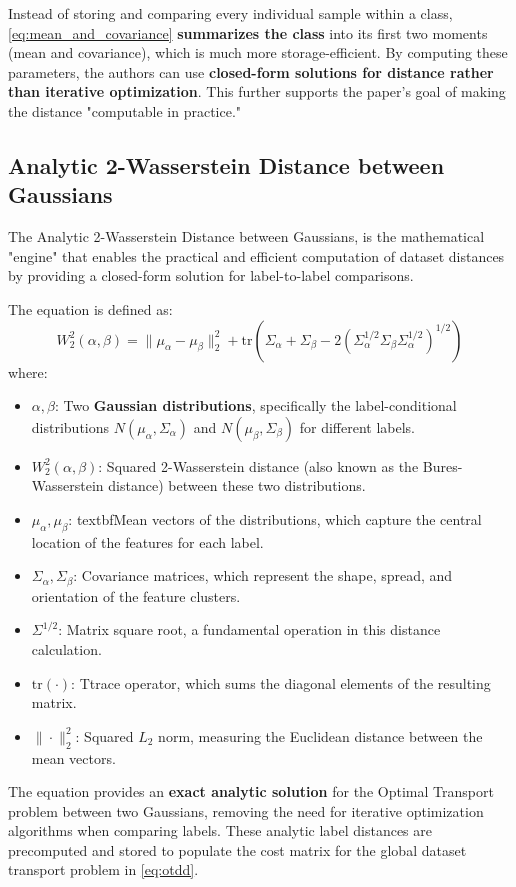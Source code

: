 \documentclass[11pt, a4paper]{article}
\theoremstyle{plain} %
\theoremstyle{definition} %
\begin{document}
			Instead of storing and comparing every individual sample within a class, \cref{eq:mean_and_covariance} \textbf{summarizes the class} into its first two moments (mean and covariance), which is much more storage-efficient. By computing these parameters, the authors can use \textbf{closed-form solutions for distance rather than iterative optimization}. This further supports the paper's goal of making the distance "computable in practice."


		\subsection{Analytic 2-Wasserstein Distance between Gaussians}
		\label{sec:wasserstein_between_gaussians}
			The Analytic 2-Wasserstein Distance between Gaussians, is the mathematical "engine" that enables the practical and efficient computation of dataset distances by providing a closed-form solution for label-to-label comparisons.

			The equation is defined as:
			\begin{equation}
				\label{eq:2_wasserstein}
				W_2^2(\alpha, \beta) = \|\mu_\alpha - \mu_\beta\|_2^2 + \text{tr}\left(\Sigma_\alpha + \Sigma_\beta - 2\left(\Sigma_\alpha^{1/2} \Sigma_\beta \Sigma_\alpha^{1/2}\right)^{1/2}\right)
			\end{equation}
			where:
			\begin{itemize}
				\item $\alpha, \beta$: Two \textbf{Gaussian distributions}, specifically the label-conditional distributions $N(\mu_\alpha, \Sigma_\alpha)$ and $N(\mu_\beta, \Sigma_\beta)$ for different labels.
				\item $W_2^2(\alpha, \beta)$: Squared 2-Wasserstein distance (also known as the Bures-Wasserstein distance) between these two distributions.
				\item $\mu_\alpha, \mu_\beta$: textbf{Mean vectors} of the distributions, which capture the central location of the features for each label.
				\item $\Sigma_\alpha, \Sigma_\beta$: Covariance matrices, which represent the shape, spread, and orientation of the feature clusters.
				\item $\Sigma^{1/2}$: Matrix square root, a fundamental operation in this distance calculation.
				\item $\text{tr}(\cdot)$: Ttrace operator, which sums the diagonal elements of the resulting matrix.
				\item $\|\cdot\|_2^2$: Squared $L_2$ norm, measuring the Euclidean distance between the mean vectors.
			\end{itemize}
			The equation provides an \textbf{exact analytic solution} for the Optimal Transport problem between two Gaussians, removing the need for iterative optimization algorithms when comparing labels. These analytic label distances are precomputed and stored to populate the cost matrix for the global dataset transport problem in \cref{eq:otdd}.
\end{document}
